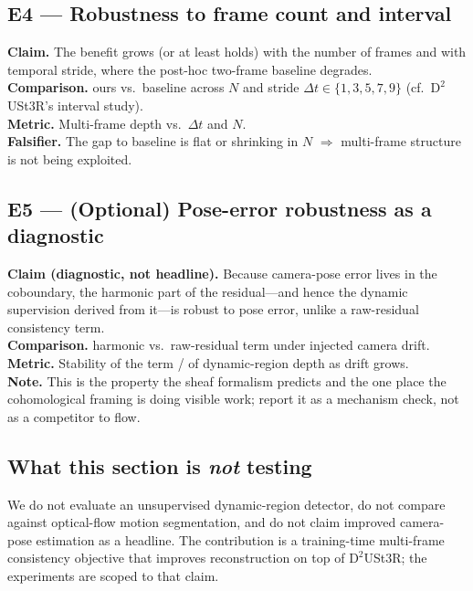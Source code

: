 \documentclass{article}
\theoremstyle{definition}
\theoremstyle{plain}
\theoremstyle{remark}
\begin{document}
\subsection{E4 --- Robustness to frame count and interval}
\label{sec:e4}
\textbf{Claim.} The benefit grows (or at least holds) with the number of
frames and with temporal stride, where the post-hoc two-frame baseline
degrades.\\
\textbf{Comparison.} ours vs.\ baseline across $N$ and stride
$\Delta t\in\{1,3,5,7,9\}$ (cf.\ $\mathrm{D}^2$USt3R's interval study).\\
\textbf{Metric.} Multi-frame depth vs.\ $\Delta t$ and $N$.\\
\textbf{Falsifier.} The gap to baseline is flat or shrinking in $N$
$\Rightarrow$ multi-frame structure is not being exploited.

\subsection{E5 --- (Optional) Pose-error robustness as a diagnostic}
\label{sec:e5}
\textbf{Claim (diagnostic, not headline).} Because camera-pose error lives
in the coboundary, the harmonic part of the residual---and hence the
dynamic supervision derived from it---is robust to pose error, unlike a
raw-residual consistency term.\\
\textbf{Comparison.} harmonic vs.\ raw-residual term under injected camera
drift.\\
\textbf{Metric.} Stability of the term / of dynamic-region depth as drift
grows.\\
\textbf{Note.} This is the property the sheaf formalism predicts and the
one place the cohomological framing is doing visible work; report it as a
mechanism check, not as a competitor to flow.

\subsection{What this section is \emph{not} testing}
\label{sec:exp-scope}
We do not evaluate an unsupervised dynamic-region detector, do not compare
against optical-flow motion segmentation, and do not claim improved
camera-pose estimation as a headline. The contribution is a training-time
multi-frame consistency objective that improves reconstruction on top of
$\mathrm{D}^2$USt3R; the experiments are scoped to that claim.



\end{document}
